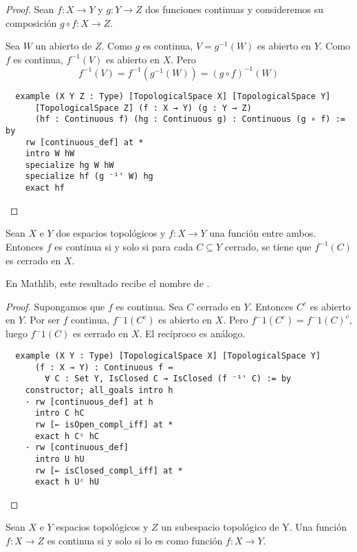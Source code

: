 \begin{proof}
  Sean $f : X \to Y$ y $g : Y \to Z$ dos funciones continuas y consideremos su composición $g \circ f : X \to Z$.

  Sea $W$ un abierto de $Z$. Como $g$ es continua, $V = g^{-1}(W)$ es abierto en $Y$. Como $f$ es continua, $f^{-1}(V)$ es abierto en $X$. Pero
  $$
  f^{-1}(V) = f^{-1}(g^{-1}(W)) = (g \circ f)^{-1}(W)
  $$

  \begin{lstlisting}
  example (X Y Z : Type) [TopologicalSpace X] [TopologicalSpace Y]
      [TopologicalSpace Z] (f : X → Y) (g : Y → Z)
      (hf : Continuous f) (hg : Continuous g) : Continuous (g ∘ f) := by
    rw [continuous_def] at *
    intro W hW
    specialize hg W hW
    specialize hf (g ⁻¹' W) hg
    exact hf \end{lstlisting}
\end{proof}

\begin{proposition}
  Sean $X$ e $Y$ dos espacios topológicos y $f : X \to Y$ una función entre ambos. Entonces $f$ es continua si y solo si para cada $C \subseteq Y$ cerrado, se tiene que $f^{-1}(C)$ es cerrado en $X$.
\end{proposition}

En Mathlib, este resultado recibe el nombre de .


\begin{proof}
  Supongamos que $f$ es continua. Sea $C$ cerrado en $Y$. Entonces $C^c$ es abierto en $Y$. Por ser $f$ continua, $f^-1(C^c)$ es abierto en $X$. Pero $f^-1(C^c) = f^-1(C)^c$, luego $f^-1(C)$ es cerrado en $X$. El recíproco es análogo.
  
  \begin{lstlisting}
  example (X Y : Type) [TopologicalSpace X] [TopologicalSpace Y]
      (f : X → Y) : Continuous f ↔
        ∀ C : Set Y, IsClosed C → IsClosed (f ⁻¹' C) := by
    constructor; all_goals intro h
    · rw [continuous_def] at h
      intro C hC
      rw [← isOpen_compl_iff] at *
      exact h Cᶜ hC
    · rw [continuous_def]
      intro U hU
      rw [← isClosed_compl_iff] at *
      exact h Uᶜ hU  \end{lstlisting}

\end{proof}

\begin{proposition}
  Sean $X$ e $Y$ espacios topológicos y $Z$ un subespacio topológico de Y. Una función $f : X \to Z$ es continua si y solo si lo es como función $f : X \to Y$.
\end{proposition}


